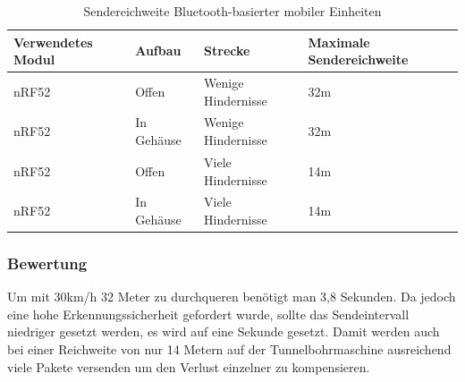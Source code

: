 \begin{table}[h]
	\centering
	\caption{Sendereichweite Bluetooth-basierter mobiler Einheiten}
	\label{table:rangeblue}
	\begin{tabular}{p{3.5cm}|p{3cm}|p{3.5cm}|p{3cm}}
		Verwendetes Modul & Aufbau & Strecke & Maximale Sendereichweite \\
		\hline
		nRF52 & Offen & Wenige Hindernisse & 32m \\
		nRF52 & In Gehäuse & Wenige Hindernisse & 32m \\
		nRF52 & Offen & Viele Hindernisse & 14m \\
		nRF52 & In Gehäuse & Viele Hindernisse & 14m \\
	\end{tabular}
\end{table}

\subsubsection{Bewertung}
Um mit 30km/h 32 Meter zu durchqueren benötigt man 3,8 Sekunden.
Da jedoch eine hohe Erkennungssicherheit gefordert wurde, sollte das Sendeintervall niedriger gesetzt werden, es wird auf eine Sekunde gesetzt.
Damit werden auch bei einer Reichweite von nur 14 Metern auf der Tunnelbohrmaschine ausreichend viele Pakete versenden um den Verlust einzelner zu kompensieren.

